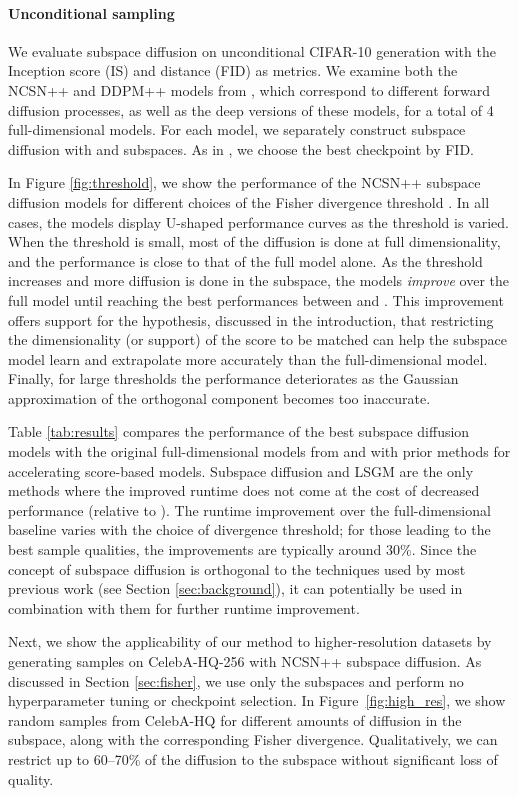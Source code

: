 \documentclass{article}
\begin{document}
\paragraph{\textbf{Unconditional sampling}} We evaluate subspace diffusion on unconditional CIFAR-10 generation with the Inception score (IS) and distance (FID) as metrics. We examine both the NCSN++ and DDPM++ models from \cite{song2021score}, which correspond to different forward diffusion processes, as well as the deep versions of these models, for a total of 4 full-dimensional models. For each model, we separately construct subspace diffusion with  and  subspaces. As in \cite{song2021score}, we choose the best checkpoint by FID.

In Figure \ref{fig:threshold}, we show the performance of the NCSN++ subspace diffusion models for different choices of the Fisher divergence threshold . In all cases, the models display U-shaped performance curves as the threshold is varied. When the threshold is small, most of the diffusion is done at full dimensionality, and the performance is close to that of the full model alone. As the threshold increases and more diffusion is done in the subspace, the models \emph{improve} over the full model until reaching the best performances between  and . This improvement offers support for the hypothesis, discussed in the introduction, that restricting the dimensionality (or support) of the score to be matched can help the subspace model learn and extrapolate more accurately than the full-dimensional model. Finally, for large thresholds the performance deteriorates as the Gaussian approximation of the orthogonal component becomes too inaccurate.

Table \ref{tab:results} compares the performance of the best subspace diffusion models with the original full-dimensional models from \cite{song2021score} and with prior methods for accelerating score-based models. Subspace diffusion and LSGM \cite{vahdat2021score} are the only methods where the improved runtime does not come at the cost of decreased performance (relative to \cite{song2021score}). The runtime improvement over the full-dimensional baseline varies with the choice of divergence threshold; for those leading to the best sample qualities, the improvements are typically around 30\%. Since the concept of subspace diffusion is orthogonal to the techniques used by most previous work (see Section \ref{sec:background}), it can potentially be used in combination with them for further runtime improvement. 

Next, we show the applicability of our method to higher-resolution datasets by generating samples on CelebA-HQ-256 with NCSN++ subspace diffusion. As discussed in Section \ref{sec:fisher}, we use only the  subspaces and perform no hyperparameter tuning or checkpoint selection. In Figure~\ref{fig:high_res}, we show random samples from CelebA-HQ for different amounts of diffusion in the subspace, along with the corresponding Fisher divergence. Qualitatively, we can restrict up to 60--70\% of the diffusion to the subspace without significant loss of quality.
\end{document}
